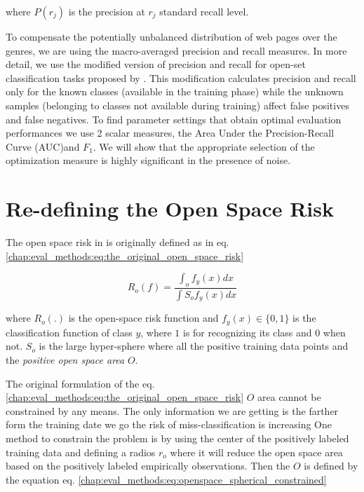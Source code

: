 {\noindent
where $P(r_j)$ is the precision at $r_j$ standard recall level.


To compensate the potentially unbalanced distribution of web pages over the genres, we are using the macro-averaged precision and recall measures. In more detail, we use the modified version of precision and recall for open-set classification tasks proposed by \parencite{mendesjunior2016}. This modification calculates precision and recall only for the known classes (available in the training phase) while the unknown samples (belonging to classes not available during training) affect false positives and false negatives. To find parameter settings that obtain optimal evaluation performances we use 2 scalar measures, the Area Under the Precision-Recall Curve (AUC)and $F_{1}$. We will show that the appropriate selection of the optimization measure is highly significant in the presence of noise.


\section{Re-defining the Open Space Risk}\label{chap:eval_methods:sec:open_space_risk} 

The open space risk in \parencite{scheirer2013toward} is originally defined as in eq. \ref{chap:eval_methods:eq:the_original_open_space_risk}

\begin{equation}\label{chap:eval_methods:eq:the_original_open_space_risk}
	R_{o}(f) = \frac{\int_{o} f_{y}(x) dx}{\int{S_{o}}  f_{y}(x) dx}

\end{equation}

\noindent
where $R_{o}(.)$ is the open-space risk function and $f_{y}(x)  \in \{0, 1\}$ is the classification function of class $y$, where $1$ is for recognizing its class and $0$ when not. $S_{o}$ is the large hyper-sphere where all the positive training data points and the \textit{positive open space area} $O$. 

The original formulation of the eq. \ref{chap:eval_methods:eq:the_original_open_space_risk} $O$ area cannot be constrained by any means. The only information we are getting is the farther form the training date we go the risk of miss-classification is increasing One method to constrain the problem is by using the center of the positively labeled training data and defining a radios $r_{o}$ where it will reduce the open space area based on the positively labeled empirically observations. Then the $O$ is defined by the equation eq. \ref{chap:eval_methods:eq:openspace_spherical_constrained}

}
